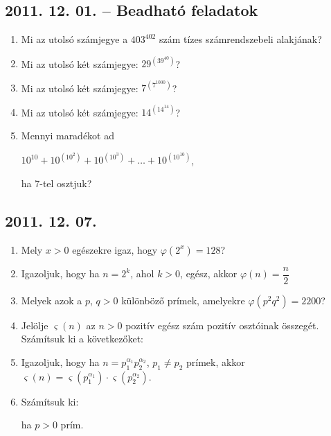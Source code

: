 	\subsection*{2011. 12. 01. -- Beadható feladatok}
	\begin{enumerate}
		\item Mi az utolsó számjegye a $403^{402}$ szám tízes számrendszebeli alakjának?
		\item Mi az utolsó két számjegye: $29^{(39^{40})}$?
		\item Mi az utolsó két számjegye: $7^{(7^{1000})}$?
		\item Mi az utolsó két számjegye: $14^{(14^{14})}$?
		\item Mennyi maradékot ad
		\begin{center}
			$10^{10}+10^{(10^2)}+10^{(10^3)}+\ldots+10^{(10^{10})}$,
		\end{center}
		ha 7-tel osztjuk?
	\end{enumerate}
	
	
	\subsection*{2011. 12. 07.}
	\begin{enumerate}
		\item Mely $x>0$ egészekre igaz, hogy $\varphi(2^x)=128$?
		\item Igazoljuk, hogy ha $n=2^k$, ahol $k>0$, egész, akkor $\varphi(n)=\dfrac{n}{2}$
		\item Melyek azok a $p$, $q>0$ különböző prímek, amelyekre $\varphi(p^2q^2)=2200$?
		\item Jelölje $\varsigma(n)$ az $n>0$ pozitív egész szám pozitív osztóinak összegét. Számítsuk ki a következőket:
		\item Igazoljuk, hogy ha $n=p_1^{\alpha_1}p_2^{\alpha_2}$, $p_1\ne p_2$ prímek, akkor $\varsigma(n)=\varsigma(p_1^{\alpha_1})\cdot\varsigma(p_2^{\alpha_2})$.
		\item Számítsuk ki:
		ha $p>0$ prím.
	\end{enumerate}
	
